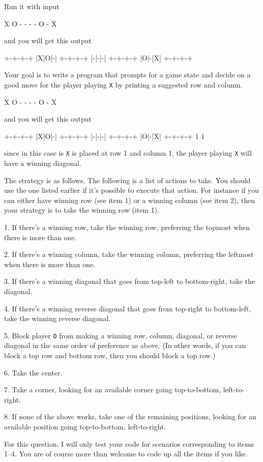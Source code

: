 Run it with input
\begin{console}[fontsize=\small,commandchars=\\\{\}]
X O - - - - O - X
\end{console}
and you will get this output
\begin{console}[fontsize=\small,commandchars=\\\{\}]
+-+-+-+
|X|O|-|
+-+-+-+
|-|-|-|
+-+-+-+
|O|-|X|
+-+-+-+
\end{console}
Your goal is to write a program that prompts for a game state
and decide on a good move for the player playing \verb!X! by 
printing a suggested row and column.
\begin{console}[fontsize=\small,commandchars=\\\{\}]
X O - - - - O - X
\end{console}
and you will get this output
\begin{console}[fontsize=\small]
+-+-+-+
|X|O|-|
+-+-+-+
|-|-|-|
+-+-+-+
|O|-|X|
+-+-+-+
1 1
\end{console}
since in this case is \verb!X! is placed at row 1 and column 1, 
the player playing \verb!X! will have a winning diagonal.

The strategy is as follows.
The following is a list of actions to take.
You should use the one listed earlier if it's possible to execute that
action.
For instance if you can either have winning row (see item 1)
or a winning column (see item 2),
then your strategy is to take the winning row (item 1).
\begin{tightlist}
\item[1.] 
If there's a winning row, take the winning row, 
preferring the topmost when there is more than one.
\item[2.]
If there's a winning column, take the winning column,
preferring the leftmost when there is more than one.
\item[3.]
If there's a winning diagonal that goes from
top-left to bottom-right, take the diagonal.
\item[4.]
If there's a winning reverse diagonal that goes from top-right
to bottom-left, take the winning reverse diagonal.
\item[5.]
Block player \verb!O! from making a winning
row, column, diagonal, or reverse diagonal
in the same order of preference as above.
(In other words, if you can block a top row and bottom row,
then you should block a top row.)
\item[6.] Take the center.
\item[7.] 
Take a corner,
looking for an available corner going top-to-bottom, left-to-right.
\item[8.]
If none of the above works, take one of the remaining positions,
looking for an available position going top-to-bottom, left-to-right.
\end{tightlist}
For this question, I will only test your code for scenarios
corresponding to items 1--4.
You are of course more than welcome to code up all the items if you like.

